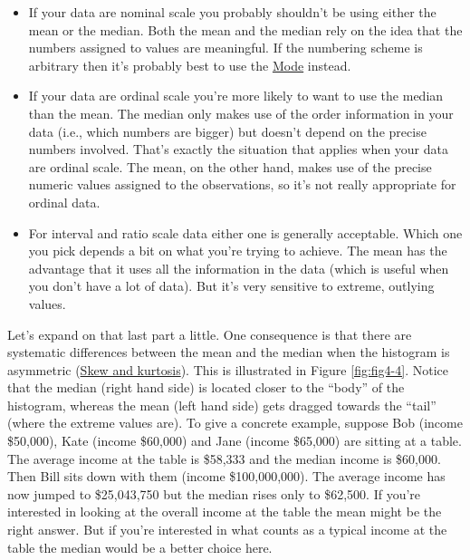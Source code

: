 \documentclass[
]{book}
\providecommand{\tightlist}{%
  \setlength{\itemsep}{0pt}\setlength{\parskip}{0pt}}
\begin{document}
\begin{itemize}
\tightlist
\item
  If your data are nominal scale you probably shouldn't be using either the mean or the median. Both the mean and the median rely on the idea that the numbers assigned to values are meaningful. If the numbering scheme is arbitrary then it's probably best to use the \protect\hyperlink{mode}{Mode} instead.
\item
  If your data are ordinal scale you're more likely to want to use the median than the mean. The median only makes use of the order information in your data (i.e., which numbers are bigger) but doesn't depend on the precise numbers involved. That's exactly the situation that applies when your data are ordinal scale. The mean, on the other hand, makes use of the precise numeric values assigned to the observations, so it's not really appropriate for ordinal data.
\item
  For interval and ratio scale data either one is generally acceptable. Which one you pick depends a bit on what you're trying to achieve. The mean has the advantage that it uses all the information in the data (which is useful when you don't have a lot of data). But it's very sensitive to extreme, outlying values.
\end{itemize}

Let's expand on that last part a little. One consequence is that there are systematic differences between the mean and the median when the histogram is asymmetric (\protect\hyperlink{skew-and-kurtosis}{Skew and kurtosis}). This is illustrated in Figure \ref{fig:fig4-4}. Notice that the median (right hand side) is located closer to the ``body'' of the histogram, whereas the mean (left hand side) gets dragged towards the ``tail'' (where the extreme values are). To give a concrete example, suppose Bob (income \$50,000), Kate (income \$60,000) and Jane (income \$65,000) are sitting at a table. The average income at the table is \$58,333 and the median income is \$60,000. Then Bill sits down with them (income \$100,000,000). The average income has now jumped to \$25,043,750 but the median rises only to \$62,500. If you're interested in looking at the overall income at the table the mean might be the right answer. But if you're interested in what counts as a typical income at the table the median would be a better choice here.
\end{document}
